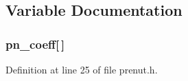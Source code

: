 \subsection{\-Variable \-Documentation}
\subsubsection[{pn\-\_\-coeff}]{ {\bf pn\-\_\-coeff}[$\,$]}\label{prenut_8h_ab89427fe580a40f71745a2a945086c0c}


\-Definition at line 25 of file prenut.\-h.

